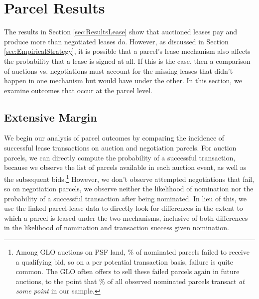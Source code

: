 \section{Parcel Results \label{sec:ResultsParcels}}

The results in Section \ref{sec:ResultsLease} show that auctioned leases pay and produce more than negotiated leases do. However, as discussed in Section \ref{sec:EmpiricalStrategy}, it is possible that a parcel's lease mechanism also affects the probability that a lease is signed at all. If this is the case, then a comparison of auctions vs. negotiations must account for the missing leases that didn't happen in one mechanism but would have under the other. In this section, we examine outcomes that occur at the parcel level. 

\subsection{Extensive Margin \label{sec:ExtensiveMargin}}
We begin our analysis of parcel outcomes by comparing the incidence of successful lease transactions on auction and negotiation parcels.  For auction parcels, we can directly compute the probability of a successful transaction, because we observe the list of parcels available in each auction event, as well as the subsequent bids.\footnote{Among GLO auctions on PSF land, \% of nominated parcels failed to receive a qualifying bid, so on a per potential transaction basis, failure is quite common.  The GLO often offers to sell these failed parcels again in future auctions, to the point that \% of all observed nominated parcels transact \textit{at some point} in our sample.} However, we don't observe attempted negotiations that fail, so on negotiation parcels, we observe neither the likelihood of nomination nor the probability of a successful transaction after being nominated. In lieu of this, we use the linked parcel-lease data to directly look for differences in the extent to which a parcel is leased under the two mechanisms, inclusive of both differences in the likelihood of nomination and transaction success given nomination.  

